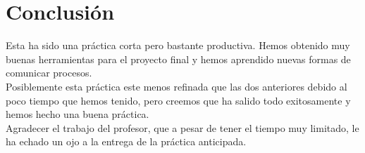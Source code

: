 \documentclass[12pt]{article}
\begin{document}
\section{Conclusión}
Esta ha sido una práctica corta pero bastante productiva. Hemos obtenido muy buenas herramientas para el proyecto final y hemos aprendido nuevas formas de comunicar procesos.\\

Posiblemente esta práctica este menos refinada que las dos anteriores debido al poco tiempo que hemos tenido, pero creemos que ha salido todo exitosamente y hemos hecho una buena práctica.\\

Agradecer el trabajo del profesor, que a pesar de tener el tiempo muy limitado, le ha echado un ojo a la entrega de la práctica anticipada.

	
\end{document}
